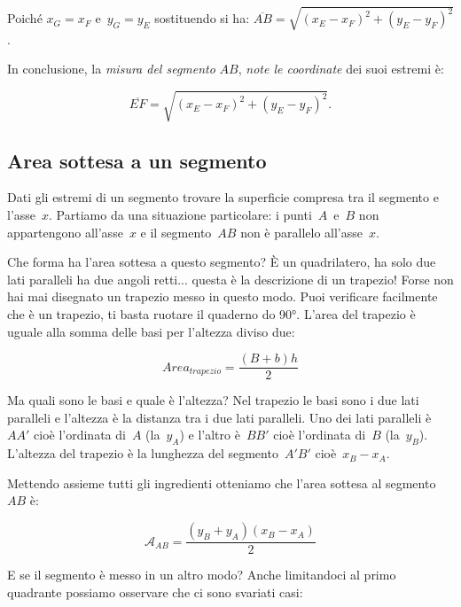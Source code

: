 Poiché $x_{G}=x_{F}$ e~$y_{G}=y_{E}$ sostituendo si ha:
$\overline{AB}=\sqrt{\left(x_{E}-x_{F}\right)^{2}+\left(y_{E}-y_{F}\right)^{2}}$.

In conclusione, la \emph{misura del segmento} $AB$, \emph{note le coordinate} 
dei suoi estremi è:

\[\overline{EF}=\sqrt{\left(x_{E}-x_{F}\right)^{2}+\left(y_{E}-y_{F}\right)^{2}}.\]


\subsection{Area sottesa a un segmento}

Dati gli estremi di un segmento trovare la superficie compresa tra il 
segmento e l'asse~$x$. Partiamo da una situazione particolare:
i punti~$A$~e~$B$ non appartengono all'asse~$x$ e il segmento~$AB$ non 
è parallelo all'asse~$x$.

\begin{center}  \end{center}

Che forma ha l'area sottesa a questo segmento? È un quadrilatero, ha solo due 
lati paralleli ha due angoli retti... questa è la descrizione di un trapezio!
Forse non hai mai disegnato un trapezio messo in questo modo. Puoi verificare 
facilmente che è un trapezio, ti basta ruotare il quaderno do 90°. 
L'area del trapezio è uguale alla somma delle basi per l'altezza diviso due:

\[Area_{trapezio}= \frac{(B+b)h}{2}\]

Ma quali sono le basi e quale è l'altezza? Nel trapezio le basi sono i due 
lati paralleli e l'altezza è la distanza tra i due lati paralleli.
Uno dei lati paralleli è~$AA'$ cioè l'ordinata di~$A$ (la~$y_A$) 
e l'altro è~$BB'$ cioè l'ordinata di~$B$ (la~$y_B$).
L'altezza del trapezio è la lunghezza del segmento~$A'B'$ 
cioè~$x_B - x_A$.

Mettendo assieme tutti gli ingredienti otteniamo che l'area sottesa al 
segmento~$AB$ è:

\[\mathcal{A}_{AB} = \frac{(y_B + y_A) (x_B - x_A)}{2}\]

E se il segmento è messo in un altro modo?
Anche limitandoci al primo quadrante possiamo osservare che ci sono svariati casi:

\begin{center}  \end{center}

